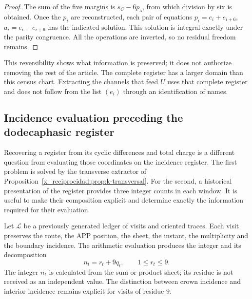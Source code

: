 \begin{proof}
The sum of the five margins is \(s_C-6p_5\), from which division
by six is obtained. Once the \(p_i\) are reconstructed, each pair of equations
\(p_i=e_i+e_{i+6}\), \(a_i=e_i-e_{i+6}\) has the indicated solution.
This solution is integral exactly under the parity congruence. All
the operations are inverted, so no residual freedom remains.
\end{proof}

This reversibility shows what information is preserved; it does not authorize
removing the rest of the article. The complete register has a larger domain
than this census chart. Extracting the channels that feed
\(U\) uses that complete register and does not follow from the list
\((e_i)\) through an identification of names.


\subsection{Incidence evaluation preceding the dodecaphasic register}
\label{x_reciprocidad:subsec:registro-evaluacion-incidencial}

Recovering a register from its cyclic differences and
total charge is a different question from evaluating those coordinates
on the incidence register. The first problem is solved by the
transverse extractor of Proposition~\ref{x_reciprocidad:prop:k-transversal}.
For the second, a historical presentation of the
register provides three integer counts in each window. It is useful
to make their composition explicit and determine exactly the information
required for their evaluation.

Let \(\mathscr L\) be a previously generated ledger of visits and oriented
traces. Each visit preserves the route, the APP position, the sheet, the
instant, the multiplicity and the boundary incidence. The arithmetic
evaluation produces the integer and its decomposition
\[
 n_t=r_t+9q_t,\qquad 1\leq r_t\leq9.
\]
The integer \(n_t\) is calculated from the sum or product sheet; its
residue is not received as an independent value. The distinction between
crown incidence and interior incidence remains explicit for
visits of residue \(9\).

